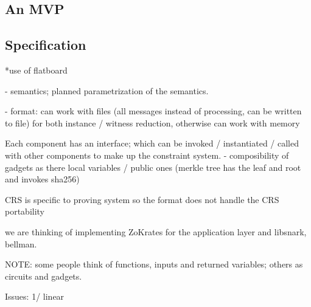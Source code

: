 \documentclass[a4paper,11pt]{article}
\begin{document}
	
	\subsection{An MVP}
	
	
	
	\subsection{Specification}
	
	*use of flatboard
	
	- semantics; planned parametrization of the semantics.
	
	- format: can work with files (all messages instead of processing, can be written to file) for both instance / witness reduction, otherwise can work with memory 
	
	Each component has an interface; which can be invoked / instantiated / called with other components to make up the constraint system.
		- composibility of gadgets as there local variables / public ones (merkle tree has the leaf and root and invokes sha256)
	
	CRS is specific to proving system so the format does not handle the CRS portability
	
	we are thinking of implementing ZoKrates for the application layer and libsnark, bellman.  
	
	NOTE: some people think of functions, inputs and returned variables; others as circuits and gadgets.
	
	
	Issues: 1/ linear 
\end{document}
